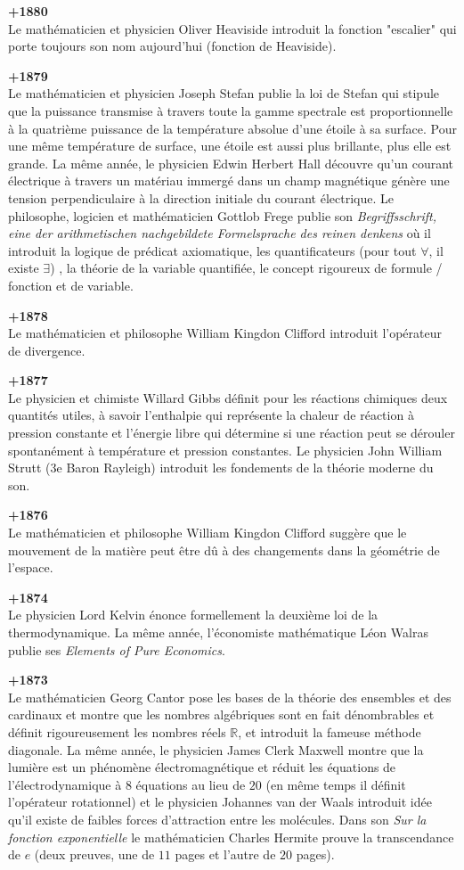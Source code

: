 \textbf{+1880}\\
Le mathématicien et physicien Oliver Heaviside introduit la fonction "escalier" qui porte toujours son nom aujourd'hui (fonction de Heaviside).

\textbf{+1879}\\
Le mathématicien et physicien Joseph Stefan publie la loi de Stefan qui stipule que la puissance transmise à travers toute la gamme spectrale est proportionnelle à la quatrième puissance de la température absolue d'une étoile à sa surface. Pour une même température de surface, une étoile est aussi plus brillante, plus elle est grande. La même année, le physicien Edwin Herbert Hall découvre qu'un courant électrique à travers un matériau immergé dans un champ magnétique génère une tension perpendiculaire à la direction initiale du courant électrique. Le philosophe, logicien et mathématicien Gottlob Frege publie son \textit{Begriffsschrift, eine der arithmetischen nachgebildete Formelsprache des reinen denkens} où il introduit la logique de prédicat axiomatique, les quantificateurs (pour tout $\forall$, il existe $\exists$) , la théorie de la variable quantifiée, le concept rigoureux de formule / fonction et de variable.

\textbf{+1878}\\
Le mathématicien et philosophe William Kingdon Clifford introduit l'opérateur de divergence.

\textbf{+1877}\\
Le physicien et chimiste Willard Gibbs définit pour les réactions chimiques deux quantités utiles, à savoir l'enthalpie qui représente la chaleur de réaction à pression constante et l'énergie libre qui détermine si une réaction peut se dérouler spontanément à température et pression constantes. Le physicien John William Strutt (3e Baron Rayleigh) introduit les fondements de la théorie moderne du son. 

\textbf{+1876}\\
Le mathématicien et philosophe William Kingdon Clifford suggère que le mouvement de la matière peut être dû à des changements dans la géométrie de l'espace.

\textbf{+1874}\\
Le physicien Lord Kelvin énonce formellement la deuxième loi de la thermodynamique. La même année, l'économiste mathématique Léon Walras publie ses \textit{Elements of Pure Economics}.

\textbf{+1873}\\
Le mathématicien Georg Cantor pose les bases de la théorie des ensembles et des cardinaux et montre que les nombres algébriques sont en fait dénombrables et définit rigoureusement les nombres réels $\mathbb{R}$, et introduit la fameuse méthode diagonale. La même année, le physicien James Clerk Maxwell montre que la lumière est un phénomène électromagnétique et réduit les équations de l'électrodynamique à $8$ équations au lieu de $20$ (en même temps il définit l'opérateur rotationnel) et le physicien Johannes van der Waals introduit idée qu'il existe de faibles forces d'attraction entre les molécules. Dans son \textit{Sur la fonction exponentielle} le mathématicien Charles Hermite prouve la transcendance de $e$ (deux preuves, une de $11$ pages et l'autre de $20$ pages).

